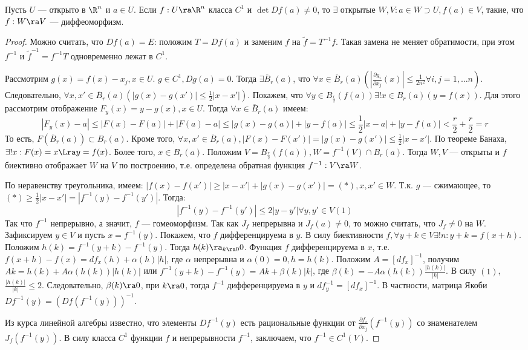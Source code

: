 \begin{theorem}
    Пусть \(U\) --- открыто в \(\R^n\) и \(a \in U\). Если \(f: U \ra \R^n\) класса \(C^1\) и \(\det Df(a) \ne 0\), то \(\exists\) открытые \(W, V: a \in W \supset U, f(a) \in V\), такие, что \(f: W \ra V\) --- диффеоморфизм.
\end{theorem}
\begin{proof}
    Можно считать, что \(Df(a) = E\): положим \(T = Df(a)\) и заменим \(f\) на \(\tilde{f} = T^{-1}f\). Такая замена не меняет обратимости, при этом \(f^{-1}\) и \(\tilde{f}^{-1} = f^{-1}T\) одновременно лежат в \(C^1\).

    Рассмотрим \(g(x) = f(x) - x_j, x \in U\). \(g \in C^1, Dg(a) = 0\). Тогда \(\exists \overline{B}_r(a)\), что \(\forall x \in \overline{B}_r(a) \left(\left| \frac{\partial g_i}{\partial x_j}(x) \right| \le \frac{1}{2n^2} \forall i, j = 1, \dots n\right)\). Следовательно, \(\forall x, x' \in \overline{B}_r(a) (|g(x) - g(x')| \le \frac{1}{2}|x - x'|)\). Покажем, что \(\forall y \in B_{\frac{r}{2}}(f(a)) \exists !x \in B_r(a) (y = f(x))\). Для этого рассмотрим отображение \(F_y(x) = y - g(x), x \in U\). Тогда \(\forall x \in \overline{B}_r(a)\) имеем: 
    \[|F_y(x) - a| \le |F(x) - F(a)| + |F(a) - a| \le |g(x) - g(a)| + |y - f(a)| \le \frac{1}{2}|x - a| + |y - f(a)| < \frac{r}{2} + \frac{r}{2} = r\]
    То есть, \(F(\overline{B}_r(a)) \subset B_r(a)\). Кроме того, \(\forall x, x' \in \overline{B}_r(a), |F(x) - F(x')| = |g(x) - g(x')| \le \frac{1}{2}|x - x'|\). По теореме Банаха, \(\exists! x: F(x) = x \Lra y = f(x)\). Более того, \(x \in B_r(a)\). Положим \(V = B_{\frac{r}{2}}(f(a)), W = f^{-1}(V) \cap B_r(a)\). Тогда \(W, V\) --- открыты и \(f\) биективно отображает \(W\) на \(V\) по построению, т.е. определена обратная функция \(f^{-1}: V \ra W\).

    По неравенству треугольника, имеем: \(|f(x) - f(x')| \ge |x - x'| + |g(x) - g(x')| = (*), x, x' \in W\). Т.к. \(g\) --- сжимающее, то \((*) \ge \frac{1}{2}|x - x'| = |f^{-1}(y) - f^{-1}(y')|\). Тогда:
    \[|f^{-1}(y) - f^{-1}(y')| \le 2|y - y'| \forall y, y' \in V (1)\]
    Так что \(f^{-1}\) непрерывно, а значит, \(f\) --- гомеоморфизм.
    Так как \(J_f\) непрерывна и \(J_f(a) \ne 0\), то можно считать, что \(J_f \ne 0\) на \(W\). Зафиксируем \(y \in V\) и пусть \(x = f^{-1}(y)\). Покажем, что \(f\) дифференцируема в \(y\). В силу биективности \(f, \forall y + k \in V \exists ! n : y + k = f(x + h)\). Положим \(h(k) = f^{-1}(y + k) - f^{-1}(y)\). Тогда \(h(k) \ra_{k \ra 0} 0\). Функция \(f\) дифференцируема в \(x\), т.е. \(f(x + h) - f(x) = df_x(h) + \alpha(h)|h|\), где \(\alpha\) непрерывна и \(\alpha(0) = 0, h = h(k)\). Положим \(A = [df_x]^{-1}\), получим \(Ak = h(k) + A\alpha(h(k))|h(k)|\) или \(f^{-1}(y + k) - f^{-1}(y) = Ak + \beta(k)|k|\), где \(\beta(k) = -A\alpha(h(k))\frac{|h(k)|}{|k|}\). В силу \((1)\), \(\frac{|h(k)|}{|k|} \le 2\). Следовательно, \(\beta(k) \ra 0\), при \(k \ra 0\), тогда \(f^{-1}\) дифференцируема в \(y\) и \(df^{-1}_y = [df_x]^{-1}\).
    В частности, матрица Якоби \(Df^{-1}(y) = (Df(f^{-1}(y)))^{-1}\).

    Из курса линейной алгебры известно, что элементы \(Df^{-1}(y)\) есть рациональные функции от \(\frac{\partial f_i}{\partial x_j}(f^{-1}(y))\) со знаменателем \(J_f(f^{-1}(y))\). В силу класса \(C^1\) функции \(f\) и непрерывности \(f^{-1}\), заключаем, что \(f^{-1} \in C^1(V)\).
\end{proof}
